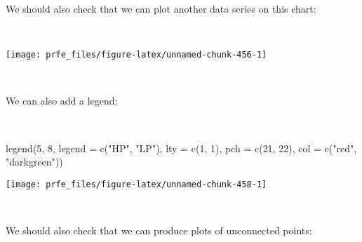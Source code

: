 \documentclass[
  12pt,
  a4paper]{book}
\newenvironment{Shaded}{\begin{snugshade}}{\end{snugshade}}
\newcommand{\AttributeTok}[1]{\textcolor[rgb]{0.77,0.63,0.00}{#1}}
\newcommand{\ConstantTok}[1]{\textcolor[rgb]{0.00,0.00,0.00}{#1}}
\newcommand{\DecValTok}[1]{\textcolor[rgb]{0.00,0.00,0.81}{#1}}
\newcommand{\FunctionTok}[1]{\textcolor[rgb]{0.00,0.00,0.00}{#1}}
\newcommand{\NormalTok}[1]{#1}
\newcommand{\SpecialCharTok}[1]{\textcolor[rgb]{0.00,0.00,0.00}{#1}}
\newcommand{\StringTok}[1]{\textcolor[rgb]{0.31,0.60,0.02}{#1}}
\begin{document}
We should also check that we can plot another data series on this chart:

~

\begin{Shaded}
\end{Shaded}

\newpage

\begin{center}\texttt{[image: prfe\_files/figure-latex/unnamed-chunk-456-1]} \end{center}

~

We can also add a legend:

~

\begin{Shaded}
\begin{Highlighting}[]
\FunctionTok{legend}\NormalTok{(}\DecValTok{5}\NormalTok{, }\DecValTok{8}\NormalTok{, }\AttributeTok{legend =} \FunctionTok{c}\NormalTok{(}\StringTok{"HP"}\NormalTok{, }\StringTok{"LP"}\NormalTok{), }\AttributeTok{lty =} \FunctionTok{c}\NormalTok{(}\DecValTok{1}\NormalTok{, }\DecValTok{1}\NormalTok{),}
       \AttributeTok{pch =} \FunctionTok{c}\NormalTok{(}\DecValTok{21}\NormalTok{, }\DecValTok{22}\NormalTok{), }\AttributeTok{col =} \FunctionTok{c}\NormalTok{(}\StringTok{"red"}\NormalTok{, }\StringTok{"darkgreen"}\NormalTok{))}
\end{Highlighting}
\end{Shaded}

\begin{center}\texttt{[image: prfe\_files/figure-latex/unnamed-chunk-458-1]} \end{center}

~

We should also check that we can produce plots of unconnected points:
\end{document}

